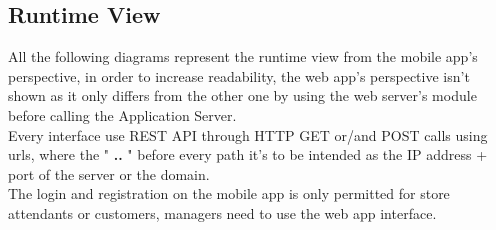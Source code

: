 \documentclass[table, 12pt]{article}
\begin{document}
\subsection{Runtime View}
All the following diagrams represent the runtime view from the mobile app's perspective, in order to increase readability, the web app's perspective isn't shown as it only differs from the other one by using the web server's module before calling the Application Server.\\
Every interface use REST API through HTTP GET or/and POST calls using urls, where the " \textbf{..} " before every path it's to be intended as the IP address + port of the server or the domain.\\
The login and registration on the mobile app is only permitted for store attendants or customers, managers need to use the web app interface.
\end{document}
